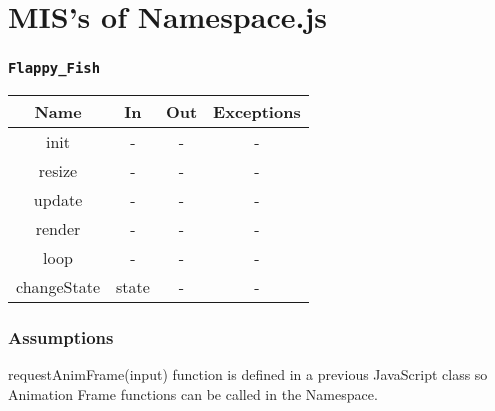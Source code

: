 \documentclass[11pt, oneside]{article}   	%
\begin{document}
\newpage
\section*{MIS's of Namespace.js}
\subsubsection*{\texttt{Flappy\_Fish}}

\begin{center}
\begin{tabular}{ |c|c|c|c| } 
 \hline
 Name & In & Out & Exceptions \\ 
 \hline \hline
 init & - & - & - \\ 
 resize & - & - & - \\ 
 update & - & - & - \\ 
 render & - & - & - \\ 
 loop & - & - & - \\ 
 changeState & state & - & - \\ 
 \hline
\end{tabular}
\end{center}

\subsubsection*{Assumptions}
requestAnimFrame(input) function is defined in a previous JavaScript class so Animation Frame functions can be called in the Namespace.
\end{document}
